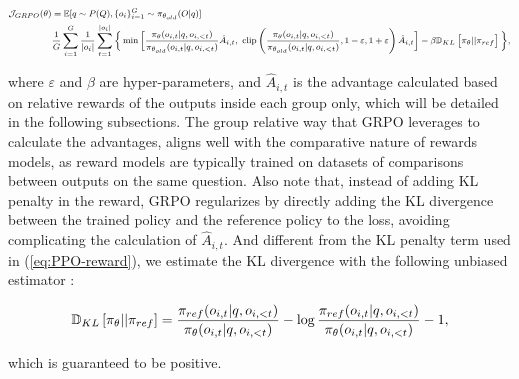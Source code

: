\begin{itemize}[topsep=0pt]
\begin{itemize}[topsep=0pt]
\begin{equation}
\footnotesize
\begin{split}
    \mathcal{J}_{GRPO}(\theta) &= \mathbb{E}{[q \sim P(Q), \{o_i\}_{i=1}^G \sim \pi_{\theta_{old}}(O|q)]}  \\
    & \frac{1}{G}\sum_{i=1}^G\frac{1}{|o_i|} \sum_{t=1}^{|o_i|} \bigg\{ \min \bigg[ \frac{\pi_\theta(o_{i,t} | q, o_{i,<t})}{\pi_{\theta_{old}}(o_{i,t} | q, o_{i,<t})} \hat{A}_{i,t}, \,\, \text{clip} \left( \frac{\pi_\theta(o_{i,t} | q, o_{i,<t})}{\pi_{\theta_{old}}(o_{i,t} | q, o_{i,<t})}, 1 - \varepsilon, 1 + \varepsilon \right)  \hat{A}_{i,t} \bigg] - \beta \mathbb{D}_{KL}\left[\pi_{\theta} || \pi_{ref}\right]\bigg\} ,
\end{split}
\label{eq:GRPO-obj}
\end{equation}

where $\varepsilon$ and $\beta$ are hyper-parameters, and $\hat{A}_{i,t}$  is the advantage calculated based on relative rewards of the outputs inside each group only, which will be detailed in the following subsections. The group relative way that GRPO leverages to calculate the advantages, aligns well with the comparative nature of rewards models,  as reward models are typically trained on datasets of comparisons between outputs on the same question. Also note that, instead of adding KL penalty in the reward, GRPO regularizes by directly adding the KL divergence between the trained policy and the reference policy to the loss, avoiding complicating the calculation of  $\hat{A}_{i,t}$. And different from the KL penalty term used in (\ref{eq:PPO-reward}), we estimate the KL divergence with the following unbiased estimator \citep{kl_approx}:

\begin{equation}
\small
    \mathbb{D}_{KL}\left[\pi_{\theta} || \pi_{ref}\right] = \frac{\pi_{ref}(o_{i,t}|q,o_{i,<t})}{\pi_{\theta}(o_{i,t}|q,o_{i,<t})}- \log\frac{\pi_{ref}(o_{i,t}|q,o_{i,<t})}{\pi_{\theta}(o_{i,t}|q,o_{i,<t})} - 1,
\end{equation}

which is guaranteed to be positive.


\end{itemize}
\end{itemize}
